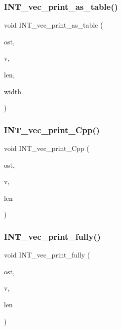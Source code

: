 \subsubsection{\texorpdfstring{I\+N\+T\+\_\+vec\+\_\+print\+\_\+as\+\_\+table()}{INT\_vec\_print\_as\_table()}}
{\footnotesize\ttfamily void I\+N\+T\+\_\+vec\+\_\+print\+\_\+as\+\_\+table (\begin{DoxyParamCaption}\item[{ostream \&}]{ost,  }\item[{\mbox{\hyperlink{galois_8h_a09fddde158a3a20bd2dcadb609de11dc}{I\+NT}} $\ast$}]{v,  }\item[{\mbox{\hyperlink{galois_8h_a09fddde158a3a20bd2dcadb609de11dc}{I\+NT}}}]{len,  }\item[{\mbox{\hyperlink{galois_8h_a09fddde158a3a20bd2dcadb609de11dc}{I\+NT}}}]{width }\end{DoxyParamCaption})}

\mbox{\label{util_8_c_ad19ad515398f223bb537e4645d0a3094}} 
\subsubsection{\texorpdfstring{I\+N\+T\+\_\+vec\+\_\+print\+\_\+\+Cpp()}{INT\_vec\_print\_Cpp()}}
{\footnotesize\ttfamily void I\+N\+T\+\_\+vec\+\_\+print\+\_\+\+Cpp (\begin{DoxyParamCaption}\item[{ostream \&}]{ost,  }\item[{\mbox{\hyperlink{galois_8h_a09fddde158a3a20bd2dcadb609de11dc}{I\+NT}} $\ast$}]{v,  }\item[{\mbox{\hyperlink{galois_8h_a09fddde158a3a20bd2dcadb609de11dc}{I\+NT}}}]{len }\end{DoxyParamCaption})}

\mbox{\label{util_8_c_aff2e5a86c89315b7cec22a5a77f94a25}} 
\subsubsection{\texorpdfstring{I\+N\+T\+\_\+vec\+\_\+print\+\_\+fully()}{INT\_vec\_print\_fully()}}
{\footnotesize\ttfamily void I\+N\+T\+\_\+vec\+\_\+print\+\_\+fully (\begin{DoxyParamCaption}\item[{ostream \&}]{ost,  }\item[{\mbox{\hyperlink{galois_8h_a09fddde158a3a20bd2dcadb609de11dc}{I\+NT}} $\ast$}]{v,  }\item[{\mbox{\hyperlink{galois_8h_a09fddde158a3a20bd2dcadb609de11dc}{I\+NT}}}]{len }\end{DoxyParamCaption})}

